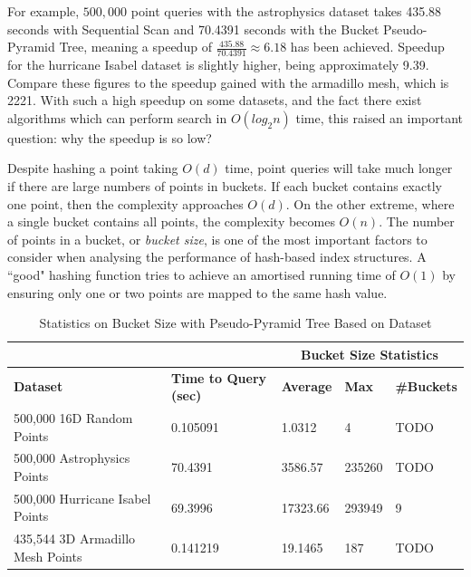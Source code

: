 For example, $500,000$ point queries with the astrophysics dataset takes 435.88 seconds with Sequential Scan and 70.4391 seconds with the Bucket Pseudo-Pyramid Tree, meaning a speedup of $\frac{435.88}{70.4391} \approx 6.18$ has been achieved. Speedup for the hurricane Isabel dataset is slightly higher, being approximately 9.39. Compare these figures to the speedup gained with the armadillo mesh, which is 2221. With such a high speedup on some datasets, and the fact there exist algorithms which can perform search in $O(log_2 n)$ time, this raised an important question: why the speedup is so low?

Despite hashing a point taking $O(d)$ time, point queries will take much longer if there are large numbers of points in buckets. If each bucket contains exactly one point, then the complexity approaches $O(d)$. On the other extreme, where a single bucket contains all points, the complexity becomes $O(n)$. The number of points in a bucket, or \textit{bucket size}, is one of the most important factors to consider when analysing the performance of hash-based index structures. A ``good" hashing function tries to achieve an amortised running time of $O(1)$ by ensuring only one or two points are mapped to the same hash value.

\begin{table}
	\centering
	\begin{tabular}{|l|l|l|l|l|}
		\hline
		& & \multicolumn{3}{c|}{\textbf{Bucket Size Statistics}} \\
		\hline
		\textbf{Dataset} & \textbf{Time to Query (sec)} & \textbf{Average} & \textbf{Max} & \textbf{\#Buckets} \\
		\hline
		500,000 16D Random Points & 0.105091 & 1.0312  & 4 & TODO \\
		500,000 Astrophysics Points & 70.4391 & 3586.57 & 235260 & TODO \\
		500,000 Hurricane Isabel Points & 69.3996 & 17323.66 & 293949 & 9 \\
		435,544 3D Armadillo Mesh Points & 0.141219 & 19.1465 & 187 & TODO \\
		\hline
	\end{tabular}
	\caption{Statistics on Bucket Size with Pseudo-Pyramid Tree Based on Dataset}
	\label{tab:perf1-bucket-stats}
\end{table}

